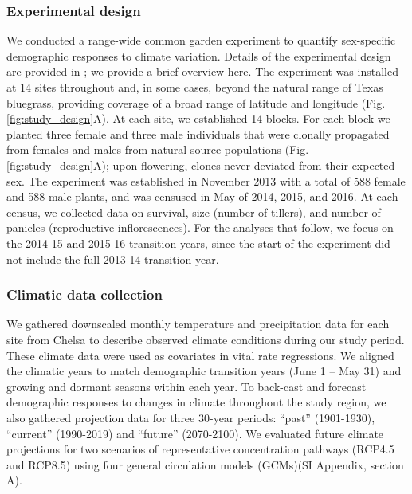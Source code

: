 \documentclass[9pt,twocolumn,twoside,lineno]{pnas-new}
\newcommand{\revise}[1]{{\color{Mahogany}{#1}}}
\begin{document}
\subsubsection*{Experimental design}
We conducted a range-wide common garden experiment to quantify sex-specific demographic responses to climate variation. 
Details of the experimental design are provided in \cite{miller2022two}; we provide a brief overview here. 
The experiment was installed at 14 sites throughout and, in some cases, beyond the natural range of Texas bluegrass, providing coverage of a broad range of latitude and longitude (Fig. \ref{fig:study_design}A).
At each site, we established 14 blocks. 
For each block we planted three female and three male individuals that were clonally propagated from females and males from \revise{\linelabel{sourcepop} seven} natural source populations (Fig. \ref{fig:study_design}A); upon flowering, clones never deviated from their expected sex. 
The experiment was established in November 2013 with a total of 588 female and 588 male plants, and was censused in May of 2014, 2015, and 2016. 
At each census, we collected data on survival, size (number of tillers), and number of panicles (reproductive inflorescences). 
For the analyses that follow, we focus on the 2014-15 and 2015-16 transition years, since the start of the experiment did not include the full 2013-14 transition year. 

\subsubsection*{Climatic data collection}
We gathered downscaled monthly temperature and precipitation data for each site from Chelsa \citep{karger2017climatologies} to describe observed climate conditions during our study period.
These climate data were used as covariates in vital rate regressions. 
We aligned the climatic years to match demographic transition years (June 1 -- May 31) and growing and dormant seasons within each year.
To back-cast and forecast demographic responses to changes in climate throughout the study region, we also gathered projection data for three 30-year periods: ``past'' (1901-1930), ``current'' (1990-2019) and ``future'' (2070-2100).
We evaluated future climate projections for two scenarios of representative concentration pathways (RCP4.5 and RCP8.5) using four general circulation models (GCMs)(SI Appendix, section A). 
\end{document}
